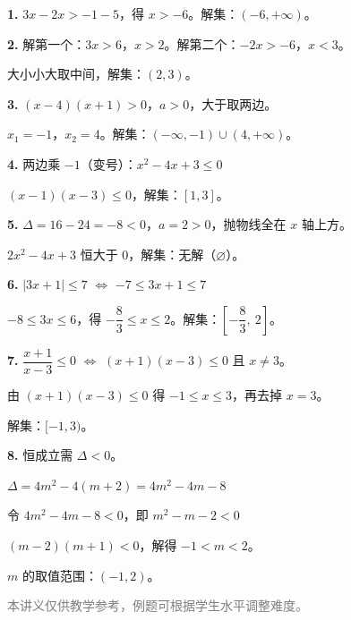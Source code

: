 \documentclass[12pt, a4paper]{ctexart}
\begin{document}
\vspace{20pt}
\begin{knowledgebox}[参考答案]

\textbf{1.} $3x - 2x > -1 - 5$，得 $x > -6$。解集：$(-6, +\infty)$。

\medskip
\textbf{2.} 解第一个：$3x > 6$，$x > 2$。解第二个：$-2x > -6$，$x < 3$。

大小小大取中间，解集：$(2, 3)$。

\medskip
\textbf{3.} $(x - 4)(x + 1) > 0$，$a > 0$，大于取两边。

$x_1 = -1$，$x_2 = 4$。解集：$(-\infty, -1) \cup (4, +\infty)$。

\medskip
\textbf{4.} 两边乘 $-1$（变号）：$x^2 - 4x + 3 \leq 0$

$(x - 1)(x - 3) \leq 0$，解集：$[1, 3]$。

\medskip
\textbf{5.} $\Delta = 16 - 24 = -8 < 0$，$a = 2 > 0$，抛物线全在 $x$ 轴上方。

$2x^2 - 4x + 3$ 恒大于 $0$，解集：无解（$\varnothing$）。

\medskip
\textbf{6.} $|3x + 1| \leq 7$ $\Leftrightarrow$ $-7 \leq 3x + 1 \leq 7$

$-8 \leq 3x \leq 6$，得 $-\dfrac{8}{3} \leq x \leq 2$。解集：$\left[-\dfrac{8}{3},\ 2\right]$。

\medskip
\textbf{7.} $\dfrac{x + 1}{x - 3} \leq 0$ $\Leftrightarrow$ $(x + 1)(x - 3) \leq 0$ 且 $x \neq 3$。

由 $(x+1)(x-3) \leq 0$ 得 $-1 \leq x \leq 3$，再去掉 $x = 3$。

解集：$[-1, 3)$。

\medskip
\textbf{8.} 恒成立需 $\Delta < 0$。

$\Delta = 4m^2 - 4(m + 2) = 4m^2 - 4m - 8$

令 $4m^2 - 4m - 8 < 0$，即 $m^2 - m - 2 < 0$

$(m - 2)(m + 1) < 0$，解得 $-1 < m < 2$。

$m$ 的取值范围：$(-1, 2)$。
\end{knowledgebox}

\vfill
\begin{center}
\small\textcolor{gray}{本讲义仅供教学参考，例题可根据学生水平调整难度。}
\end{center}
\end{document}
